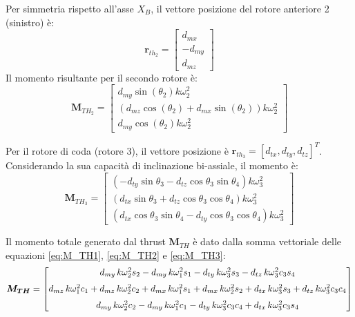 Per simmetria rispetto all'asse $X_B$, il vettore posizione del rotore anteriore 2 (sinistro) è:
\begin{equation}
    \bm{r}_{th_2} = \begin{bmatrix} d_{mx} \\ -d_{my} \\ d_{mz} \end{bmatrix} \label{eq:pos_r2}
\end{equation}
Il momento risultante per il secondo rotore è:
\begin{equation}
    \bm{M}_{TH_{2}} = \begin{bmatrix} 
        d_{my} \sin(\theta_{2}) k\omega_{2}^2 \\ 
        (d_{mz} \cos(\theta_{2}) + d_{mx} \sin(\theta_{2})) k\omega_{2}^2 \\ 
        d_{my} \cos(\theta_{2}) k\omega_{2}^2 
    \end{bmatrix} \label{eq:M_TH2}
\end{equation}

Per il rotore di coda (rotore 3), il vettore posizione è $\bm{r}_{th_3} = [d_{tx}, d_{ty}, d_{tz}]^T$. Considerando la sua capacità di inclinazione bi-assiale, il momento è:
\begin{equation}
    \bm{M}_{TH_{3}} = \begin{bmatrix} 
        (-d_{ty} \sin\theta_{3} - d_{tz} \cos\theta_{3} \sin\theta_{4}) k\omega_{3}^2 \\ 
        (d_{tx} \sin\theta_{3} + d_{tz} \cos\theta_{3} \cos\theta_{4}) k\omega_{3}^2 \\ 
        (d_{tx} \cos\theta_{3} \sin\theta_{4} - d_{ty} \cos\theta_{3} \cos\theta_{4}) k\omega_{3}^2 
    \end{bmatrix} \label{eq:M_TH3}
\end{equation}

Il momento totale generato dal thrust $\bm{M}_{TH}$ è dato dalla somma vettoriale delle equazioni \ref{eq:M_TH1}, \ref{eq:M_TH2} e \ref{eq:M_TH3}:
\begin{equation}
    \\\bm{M_{TH}} = 
    \begin{bmatrix}
        d_{my} \, k \omega_2^2 s_2 
        - d_{my} \, k \omega_1^2 s_1
        - d_{ty} \, k \omega_3^2 s_3
        - d_{tz} \, k \omega_3^2 c_3 s_4 \\[6pt]
        d_{mz} \, k \omega_1^2 c_1
        + d_{mz} \, k \omega_2^2 c_2
        + d_{mx} \, k \omega_1^2 s_1
        + d_{mx} \, k \omega_2^2 s_2
        + d_{tx} \, k \omega_3^2 s_3 
        + d_{tz} \, k \omega_3^2 c_3 c_4 \\[6pt]
        d_{my} \, k \omega_2^2 c_2
        - d_{my} \, k \omega_1^2 c_1
        - d_{ty} \, k \omega_3^2 c_3 c_4
        + d_{tx} \, k \omega_3^2 c_3 s_4
    \end{bmatrix}
\end{equation}

